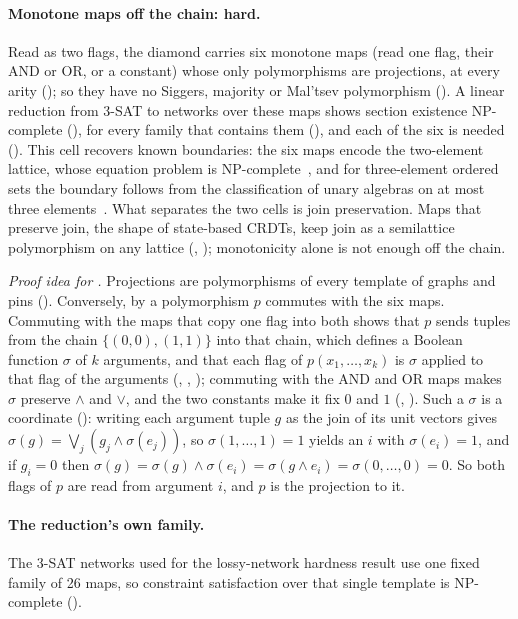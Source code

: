 \paragraph{Monotone maps off the chain: hard.} Read as two flags, the diamond carries six monotone
maps (read one flag, their AND or OR, or a constant) whose only polymorphisms are projections, at
every arity (); so they have no Siggers, majority or Mal'tsev polymorphism
(). A linear reduction from 3-SAT to networks over these maps shows section
existence NP-complete (), for every family that contains them
(), and each of the six is needed (). This cell recovers known
boundaries: the six maps encode the two-element lattice, whose equation problem is
NP-complete~\cite{larose2006}, and for three-element ordered sets the boundary follows from the
classification of unary algebras on at most three elements~\cite{broniek2006}. What separates the two
cells is join preservation. Maps that preserve join, the shape of state-based CRDTs, keep join as a
semilattice polymorphism on any lattice (, ); monotonicity alone
is not enough off the chain.

\emph{Proof idea for .} Projections are polymorphisms of every template of graphs
and pins (). Conversely, by  a polymorphism $p$ commutes with the six
maps. Commuting with the maps that copy one flag into both shows that $p$ sends tuples from the chain
$\{(0,0), (1,1)\}$ into that chain, which defines a Boolean function $\sigma$ of $k$ arguments, and that
each flag of $p(x_1, \dots, x_k)$ is $\sigma$ applied to that flag of the arguments (,
, ); commuting with the AND and OR maps makes $\sigma$ preserve $\wedge$
and $\vee$, and the two constants make it fix $0$ and $1$ (, ). Such a
$\sigma$ is a coordinate (): writing each argument tuple $g$ as the join of its
unit vectors gives $\sigma(g) = \bigvee_j (g_j \wedge \sigma(e_j))$, so $\sigma(1, \dots, 1) = 1$
yields an $i$ with $\sigma(e_i) = 1$, and if $g_i = 0$ then $\sigma(g) = \sigma(g) \wedge \sigma(e_i)
= \sigma(g \wedge e_i) = \sigma(0, \dots, 0) = 0$. So both flags of $p$ are read from argument $i$,
and $p$ is the projection to it.

\paragraph{The reduction's own family.} The 3-SAT networks used for the lossy-network hardness result
use one fixed family of 26 maps, so constraint satisfaction over that single template is NP-complete
().

